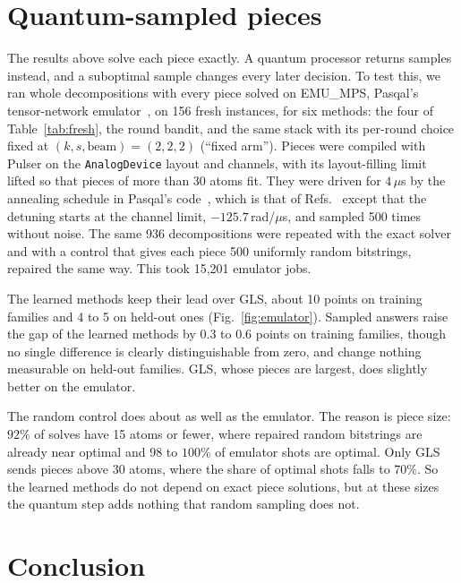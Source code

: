 \documentclass[10pt,pra,aps,twocolumn,superscriptaddress,floatfix,nofootinbib]{revtex4-2}
\newcommand{\GLS}{GLS}
\newcommand{\emumps}{EMU\_MPS}
\begin{document}
\section{Quantum-sampled pieces}
\label{sec:emulator}

The results above solve each piece exactly. A quantum processor returns samples instead, and a suboptimal sample changes every later decision. To test this, we ran whole decompositions with every piece solved on \emumps{}, Pasqal's tensor-network emulator~\cite{bidzhiev2025emulation}, on 156 fresh instances, for six methods: the four of Table~\ref{tab:fresh}, the round bandit, and the same stack with its per-round choice fixed at $(k, s, \text{beam}) = (2,2,2)$ (``fixed arm''). Pieces were compiled with Pulser on the \texttt{AnalogDevice} layout and channels, with its layout-filling limit lifted so that pieces of more than 30 atoms fit. They were driven for $4\,\mu$s by the annealing schedule in Pasqal's code~\cite{garrigues2025docking}, which is that of Refs.~\cite{cazals2025gadgets,cazals2025hard} except that the detuning starts at the channel limit, $-125.7$\,rad/$\mu$s, and sampled 500 times without noise. The same 936 decompositions were repeated with the exact solver and with a control that gives each piece 500 uniformly random bitstrings, repaired the same way. This took 15{,}201 emulator jobs.

The learned methods keep their lead over \GLS{}, about 10 points on training families and 4 to 5 on held-out ones (Fig.~\ref{fig:emulator}). Sampled answers raise the gap of the learned methods by 0.3 to 0.6 points on training families, though no single difference is clearly distinguishable from zero, and change nothing measurable on held-out families. \GLS{}, whose pieces are largest, does slightly better on the emulator.

The random control does about as well as the emulator. The reason is piece size: $92\%$ of solves have 15 atoms or fewer, where repaired random bitstrings are already near optimal and $98$ to $100\%$ of emulator shots are optimal. Only \GLS{} sends pieces above 30 atoms, where the share of optimal shots falls to $70\%$. So the learned methods do not depend on exact piece solutions, but at these sizes the quantum step adds nothing that random sampling does not.

\section{Conclusion}
\end{document}
